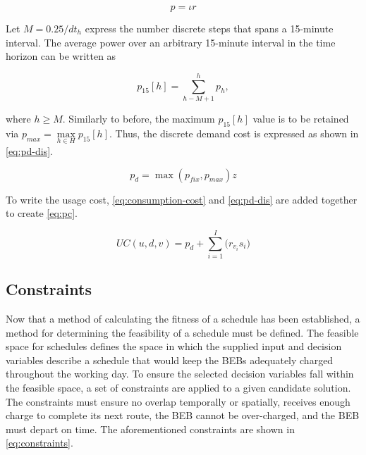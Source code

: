 \documentclass[11pt,a4paper,final]{article}
\newcommand{\UC}{UC(u, d, v)}               %
\begin{document}
\begin{equation}
\label{eq:discrete-power}
  p = \iota r
\end{equation}

Let \(M = 0.25/dt_h\) express the number discrete steps that spans a 15-minute interval. The average power over an
arbitrary 15-minute interval in the time horizon can be written as

\begin{equation}
p_{15}[h] = \sum_{h-M+1}^h p_h,
\end{equation}

where \(h \ge M\). Similarly to before, the maximum \(p_{15}[h]\) value is to be retained via \(p_{max} = \max\limits_{h \in
H}p_{15}[h]\). Thus, the discrete demand cost is expressed as shown in \ref{eq:pd-dis}.

\begin{equation}
\label{eq:pd-dis}
  p_d = \max(p_{fix}, p_{max})z
\end{equation}

To write the usage cost, \ref{eq:consumption-cost} and \ref{eq:pd-dis} are added together to create \ref{eq:pc}.

\begin{equation}
\label{eq:pc}
\UC = p_d + \sum_{i=1}^I \Big( r_{v_i}s_i \Big)
\end{equation}

\subsection{Constraints}
\label{sec:constraints}
Now that a method of calculating the fitness of a schedule has been established, a method for determining the
feasibility of a schedule must be defined. The feasible space for schedules defines the space in which the supplied
input and decision variables describe a schedule that would keep the BEBs adequately charged throughout the working day.
To ensure the selected decision variables fall within the feasible space, a set of constraints are applied to a given
candidate solution. The constraints must ensure no overlap temporally or spatially, receives enough charge to complete
its next route, the BEB cannot be over-charged, and the BEB must depart on time. The aforementioned constraints are
shown in \ref{eq:constraints}.
\end{document}
